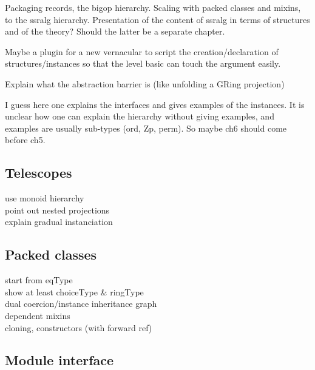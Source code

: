 
Packaging records, the bigop hierarchy.
Scaling with packed classes and mixins, to the ssralg
hierarchy. Presentation of the content of ssralg in terms of structures
and of the theory? Should the latter be a separate chapter.

Maybe a plugin for a new vernacular to script the creation/declaration
of structures/instances so that the level basic can touch the argument
easily.

Explain what the abstraction barrier is (like unfolding a GRing projection)


I guess here one explains the interfaces and gives examples of the instances.
It is unclear how one can explain the hierarchy without giving examples,
and examples are usually sub-types (ord, Zp, perm).  So maybe ch6 should
come before ch5.



\subsection{Telescopes}

use monoid hierarchy\\
point out nested projections\\
explain gradual instanciation\\

\subsection{Packed classes}

start from eqType\\
show at least choiceType & ringType\\
dual coercion/instance inheritance graph\\
dependent mixins\\
cloning, constructors (with forward ref)

\subsection{Module interface}

